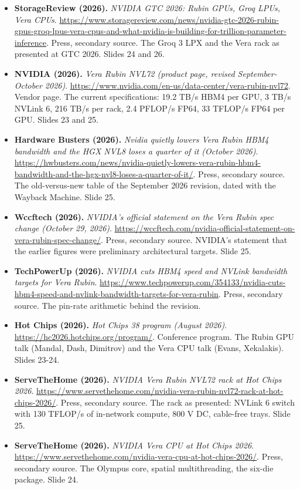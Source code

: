 \begin{itemize}[leftmargin=1.2em,itemsep=3pt]
\item \textbf{StorageReview (2026).} \textit{NVIDIA GTC 2026: Rubin GPUs, Groq LPUs, Vera CPUs}. \url{https://www.storagereview.com/news/nvidia-gtc-2026-rubin-gpus-groq-lpus-vera-cpus-and-what-nvidia-is-building-for-trillion-parameter-inference}. Press, secondary source. The Groq 3 LPX and the Vera rack as presented at GTC 2026. Slides 24 and 26.
\item \textbf{NVIDIA (2026).} \textit{Vera Rubin NVL72 (product page, revised September-October 2026)}. \url{https://www.nvidia.com/en-us/data-center/vera-rubin-nvl72}. Vendor page. The current specifications: 19.2 TB/s HBM4 per GPU, 3 TB/s NVLink 6, 216 TB/s per rack, 2.4 PFLOP/s FP64, 33 TFLOP/s FP64 per GPU. Slides 23 and 25.
\item \textbf{Hardware Busters (2026).} \textit{Nvidia quietly lowers Vera Rubin HBM4 bandwidth and the HGX NVL8 loses a quarter of it (October 2026)}. \url{https://hwbusters.com/news/nvidia-quietly-lowers-vera-rubin-hbm4-bandwidth-and-the-hgx-nvl8-loses-a-quarter-of-it/}. Press, secondary source. The old-versus-new table of the September 2026 revision, dated with the Wayback Machine. Slide 25.
\item \textbf{Wccftech (2026).} \textit{NVIDIA's official statement on the Vera Rubin spec change (October 29, 2026)}. \url{https://wccftech.com/nvidia-official-statement-on-vera-rubin-spec-change/}. Press, secondary source. NVIDIA's statement that the earlier figures were preliminary architectural targets. Slide 25.
\item \textbf{TechPowerUp (2026).} \textit{NVIDIA cuts HBM4 speed and NVLink bandwidth targets for Vera Rubin}. \url{https://www.techpowerup.com/354133/nvidia-cuts-hbm4-speed-and-nvlink-bandwidth-targets-for-vera-rubin}. Press, secondary source. The pin-rate arithmetic behind the revision.
\item \textbf{Hot Chips (2026).} \textit{Hot Chips 38 program (August 2026)}. \url{https://hc2026.hotchips.org/program/}. Conference program. The Rubin GPU talk (Mandal, Dash, Dimitrov) and the Vera CPU talk (Evans, Xekalakis). Slides 23-24.
\item \textbf{ServeTheHome (2026).} \textit{NVIDIA Vera Rubin NVL72 rack at Hot Chips 2026}. \url{https://www.servethehome.com/nvidia-vera-rubin-nvl72-rack-at-hot-chips-2026/}. Press, secondary source. The rack as presented: NVLink 6 switch with 130 TFLOP/s of in-network compute, 800 V DC, cable-free trays. Slide 25.
\item \textbf{ServeTheHome (2026).} \textit{NVIDIA Vera CPU at Hot Chips 2026}. \url{https://www.servethehome.com/nvidia-vera-cpu-at-hot-chips-2026/}. Press, secondary source. The Olympus core, spatial multithreading, the six-die package. Slide 24.

\end{itemize}

